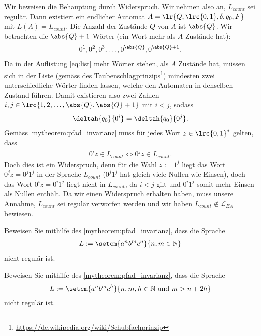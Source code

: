 \begin{myproof}
	Wir beweisen die Behauptung durch Widerspruch. Wir nehmen also an, $L_{count}$ sei regulär. Dann existiert ein endlicher Automat $A = \lr{Q,\lrc{0,1}, \delta, q_0, F}$ mit $L(A) = L_{count}$. Die Anzahl der Zustände $Q$ von $A$ ist $\abs{Q}$. Wir betrachten die $\abs{Q}+1$ Wörter (ein Wort mehr als $A$ Zustände hat):
	\begin{align}\label{eq:list}
		0^1, 0^2, 0^3, \ldots , 0^{\abs{Q}}, 0^{\abs{Q}+1}.
	\end{align}
    Da in der Auflistung \ref{eq:list} mehr Wörter stehen, als $A$ Zustände hat, müssen sich in der Liste (gemäss des Taubenschlagprinzips\footnote{\url{https://de.wikipedia.org/wiki/Schubfachprinzip}}) mindesten zwei unterschiedliche Wörter finden lassen, welche den Automaten in denselben Zustand führen. Damit existieren also zwei Zahlen $i,j\in\lrc{1,2,\ldots ,\abs{Q}, \abs{Q}+1}$ mit $i<j$, sodass
	\begin{align*}
		\deltah{q_0}{0^i} = \deltah{q_0}{0^j}.
	\end{align*}
	Gemäss \cref{mytheorem:pfad_invarianz} muss für jedes Wort $z\in\lrc{0,1}^*$ gelten, dass
	\begin{align*}
		0^iz\in L_{count} \Longleftrightarrow 0^jz\in L_{count}.
	\end{align*}
	Doch dies ist ein Widerspruch, denn für die Wahl $z := 1^j$ liegt das Wort $0^jz = 0^j1^j$ in der Sprache $L_{count}$ ($0^j1^j$ hat gleich viele Nullen wie Einsen), doch das Wort $0^iz = 0^i1^j$ liegt nicht in $L_{count}$, da $i<j$ gilt und $0^i1^j$ somit mehr Einsen als Nullen enthält. Da wir einen Widerspruch erhalten haben, muss unsere Annahme, $L_{count}$ sei regulär verworfen werden und wir haben $L_{count}\notin \mathcal{L}_{EA}$ bewiesen.
\end{myproof}

\begin{myexercise}\label{myexercise:0405}
	Beweisen Sie mithilfe des \cref{mytheorem:pfad_invarianz}, dass die Sprache
	\begin{align}\label{eq:L2}
		L := \setcm{a^n b^m c^n}{n,m\in\mathbb{N}}
	\end{align}
	nicht regulär ist.
\end{myexercise}

\begin{myexercise}\label{myexercise:0406}
	Beweisen Sie mithilfe des \cref{mytheorem:pfad_invarianz}, dass die Sprache
	\begin{align}\label{eq:L3}
		L := \setcm{a^n b^m c^h}{n,m,h\in\mathbb{N} \text{ und } m > n + 2h}
	\end{align}
	nicht regulär ist.
\end{myexercise}

